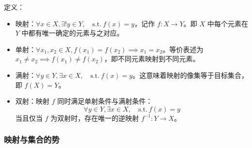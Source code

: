 \begin{definition}[映射、单射、满射与双射]

定义：

\begin{itemize}
  \item {映射：$\displaystyle \forall x \in X, \exists ! y \in Y,\quad \text{s.t.} \ f(x) = y$，记作 $\displaystyle f: X \to Y$。即 $\displaystyle X$ 中每个元素在 $\displaystyle Y$ 中都有唯一确定的元素与之对应。

}\item {单射：$\displaystyle \forall x_1, x_2 \in X, f(x_1) = f(x_2) \implies x_1 = x_2$。等价表述为 $\displaystyle x_1 \ne x_2 \implies f(x_1) \ne f(x_2)$，即不同元素映射到不同元素。

}\item {满射：$\displaystyle \forall y \in Y, \exists x \in X,\quad \text{s.t.} \ f(x) = y$。这意味着映射的像集等于目标集合，即 $\displaystyle f(X) = Y$。

}\item {双射：映射 $\displaystyle f$ 同时满足单射条件与满射条件：$$
\displaystyle \forall y \in Y, \exists  x \in X,\quad \text{s.t.} \ f(x) = y$$
当且仅当 $\displaystyle f$ 为双射时，存在唯一的逆映射 $\displaystyle f^{-1}: Y \to X$。

}
\end{itemize}

\end{definition}

\subsubsection{映射与集合的势}

